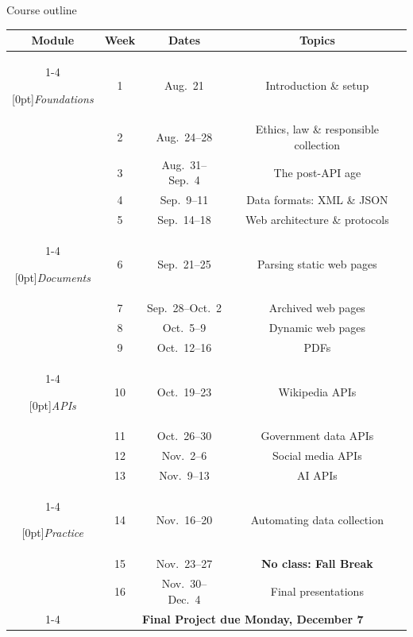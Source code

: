 \documentclass[9pt,aspectratio=169]{beamer}
\begin{document}
\begin{frame}{Course outline}
\begin{table}[ht]
\footnotesize
\centering
    \begin{tabular}{cccc}
        \toprule[.15em]
        \textbf{Module} & \textbf{Week} & \textbf{Dates} & \textbf{Topics} \\
        \cmidrule[.1em](lr){1-4}

        \multirow{5}{*}[0pt]{\textit{Foundations}}
            & 1 & Aug.~21 & Introduction \& setup \\
            & 2 & Aug.~24--28 & Ethics, law \& responsible collection \\
            & 3 & Aug.~31--Sep.~4 & The post-API age \\
            & 4 & Sep.~9--11 & Data formats: XML \& JSON \\
            & 5 & Sep.~14--18 & Web architecture \& protocols \\ \cmidrule[.1em](lr){1-4}

        \multirow{4}{*}[0pt]{\textit{Documents}}
            & 6 & Sep.~21--25 & Parsing static web pages \\
            & 7 & Sep.~28--Oct.~2 & Archived web pages \\
            & 8 & Oct.~5--9 & Dynamic web pages \\
            & 9 & Oct.~12--16 & PDFs \\ \cmidrule[.1em](lr){1-4}

        \multirow{4}{*}[0pt]{\textit{APIs}}
            & 10 & Oct.~19--23 & Wikipedia APIs \\
            & 11 & Oct.~26--30 & Government data APIs \\
            & 12 & Nov.~2--6 & Social media APIs \\
            & 13 & Nov.~9--13 & AI APIs \\ \cmidrule[.1em](lr){1-4}

        \multirow{3}{*}[0pt]{\textit{Practice}}
            & 14 & Nov.~16--20 & Automating data collection \\
            & 15 & Nov.~23--27 & \textbf{No class: Fall Break} \\
            & 16 & Nov.~30--Dec.~4 & Final presentations \\
            \cmidrule[.1em](lr){1-4}
            & \multicolumn{3}{c}{\textbf{Final Project due Monday, December 7}} \\

        \bottomrule[.15em]
    \end{tabular}
\end{table}
    
\end{frame}
\end{document}
